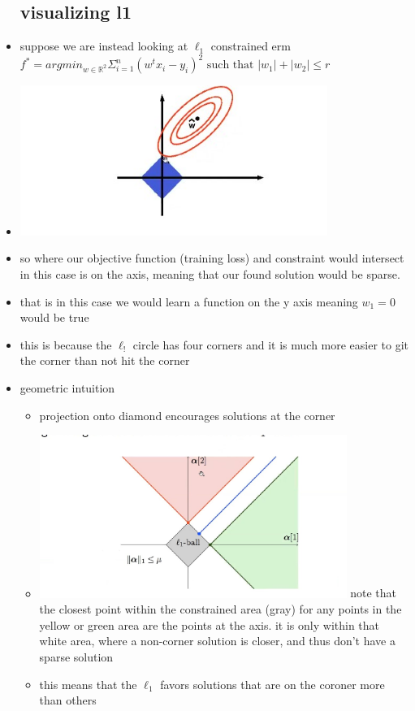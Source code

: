 \documentclass{article}
\begin{document}
\begin{itemize}
\subsection{visualizing l1}
\item suppose we are instead looking at $\ell_{1}$ constrained erm $f^{*}=argmin_{w\in \mathbb{R}^{2}} \Sigma_{i=1}^{n}(w^{t}x_i-y_i)^{2}\text{ such that } |w_1|+|w_2|\leq r$ 
\item \includegraphics[width=10cm]{lecture_notes/lecture_3/immages/l3_7.jpg}
\item so where our objective function (training loss) and constraint would intersect in this case is on the axis, meaning that our found solution would be sparse. 
\item that is in this case we would learn a function on the y axis meaning $w_1=0$ would be true 
\item this is because the $\ell_{!}$ circle has four corners and it is much more easier to git the corner than not hit the corner 
\item geometric intuition 
\begin{itemize}
    \item projection onto diamond encourages solutions at the corner
    \item \includegraphics[width=10cm]{lecture_notes/lecture_3/immages/l3_8.jpg} note that the closest point within the constrained area (gray) for any points in the yellow or green area are the points at the axis. 
    \iitem it is only within that white area, where a non-corner solution is closer, and thus don't have a sparse solution
    \item this means that the $\ell_{1}$ favors  solutions that are on the coroner more than others
\end{itemize}

\end{itemize}
\end{document}
